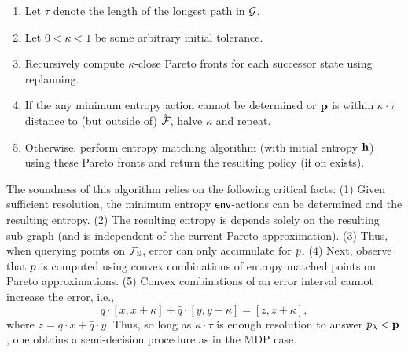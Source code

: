 \begin{mdframed}
\begin{enumerate}
\item Let $\tau$ denote the length of the longest path in $\mathcal{G}$.
\item Let $0 < \kappa < 1$ be some arbitrary initial tolerance.
\item Recursively compute $\kappa$-close Pareto fronts for each successor state using replanning.
\item If the any minimum entropy action cannot be determined or $\mathbf{p}$ is within $\kappa\cdot \tau$ distance to (but outside of) $\hat{\mathcal{F}_{}}$,
  halve $\kappa$ and repeat.
\item Otherwise, perform entropy matching algorithm (with initial
  entropy $\mathbf{h}$) using these Pareto fronts and return the
  resulting policy (if on exists).
\end{enumerate}  
\end{mdframed}
The soundness of this algorithm relies on the following critical
facts: (1) Given sufficient resolution, the minimum entropy
$\mathsf{env}$-actions can be determined and the resulting entropy. (2) The
resulting entropy is depends solely on
the resulting sub-graph (and is independent of the current Pareto
approximation). (3) Thus, when querying points on
$\mathcal{F}_{\mathbb{S}}$, error can only accumulate for $p$. (4) Next,
observe that $p$ is computed using convex combinations of entropy
matched points on Pareto approximations. (5) Convex combinations of an error interval cannot
increase the error, i.e.,
\begin{equation}
  q\cdot[x, x + \kappa] + \bar{q}\cdot[y, y + \kappa] = [z, z + \kappa],
\end{equation}
where $z = q\cdot x + \bar{q}\cdot y$.
Thus, so long as $\kappa\cdot\tau$ is enough resolution to answer $p_\lambda <
\mathbf{p}$, one obtains a semi-decision procedure as in the MDP
case.

